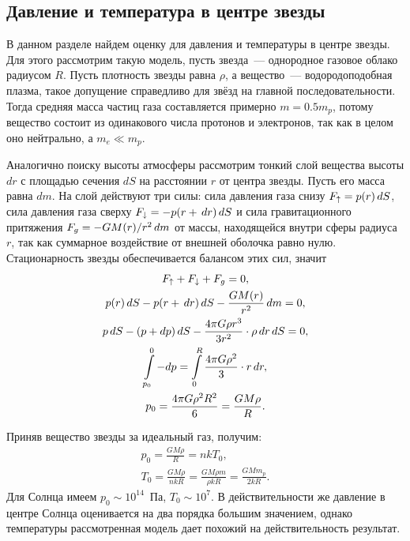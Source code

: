 \subsection{Давление и температура в центре звезды}
В данном разделе найдем оценку для давления и температуры в центре звезды. Для этого рассмотрим такую модель, пусть звезда~--- однородное газовое облако радиусом $R$. Пусть плотность звезды равна $\rho$, а вещество~--- водородоподобная плазма, такое допущение справедливо для звёзд на главной последовательности. Тогда средняя масса частиц газа составляется примерно $m = 0.5m_p$, потому вещество состоит из одинакового числа протонов и электронов, так как в целом оно нейтрально, а $m_e \ll m_p$.

Аналогично поиску высоты атмосферы рассмотрим тонкий слой вещества высоты $dr$ с площадью сечения $dS$ на расстоянии $r$ от центра звезды. Пусть его масса  равна $dm$. На слой действуют три силы: сила давления газа снизу $F_\uparrow = p(r)\,d S$, сила давления газа сверху $F_\downarrow = -p(r + \,d r)\,d S$ и сила гравитационного притяжения $F_g = -GM(r)/r^2\,d m$ от массы, находящейся внутри сферы радиуса $r$, так как суммарное воздействие от внешней оболочка равно нулю. Стационарность звезды обеспечивается балансом этих сил, значит
\begin{gather*}
	F_\uparrow + F_\downarrow + F_g = 0,\\
	p(r)\,d S - p(r + \,d r)\,d S - \frac{GM(r)}{r^2}\,d m = 0,\\
	p\,d S - (p + dp)\,d S - \frac{4\pi G \rho r^3}{3r^2} \cdot \rho \,d r \,d S = 0,\\
	\int\limits_{p_0}^0 -dp = \int\limits_{0}^R \frac{4\pi G \rho^2}{3} \cdot r\,d r,\\
 	p_0 = \frac{4\pi G \rho^2 R^2}{6} = \frac{GM\rho}{R}.
\end{gather*}

Приняв вещество звезды за идеальный газ, получим:
\begin{gather*}
	p_0 = \frac{G M \rho}{R} = n k T_0,\\
	T_0 = \frac{G M \rho}{n k R} = \frac{G M \rho m}{\rho k R} = \frac{G M m_p}{2k R}.
\end{gather*}
Для Солнца имеем $p_0 \sim 10^{14}$~Па, $T_0 \sim 10^7$. В действительности же давление в центре Солнца оценивается на два порядка большим значением, однако температуры рассмотренная модель дает похожий на действительность результат.